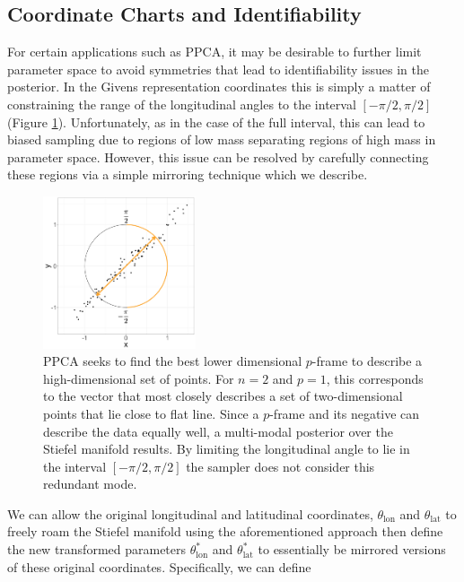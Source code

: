 \documentclass[ba]{imsart}
\numberwithin{equation}{section}
\theoremstyle{plain}
\begin{document}
\subsection{Coordinate Charts and Identifiability}\label{charts_identifiability}
For certain applications such as PPCA, it may be desirable to further limit parameter space to avoid symmetries that lead to identifiability issues in the posterior. In the Givens representation coordinates this is simply a matter of constraining the range of the longitudinal angles to the interval $[-\pi/2,\pi/2]$ (Figure \ref{fig:limiting_pca}). Unfortunately, as in the case of the full interval, this can lead to biased sampling due to regions of low mass separating regions of high mass in parameter space. However, this issue can be resolved by carefully connecting these regions via a simple mirroring technique which we describe.

\begin{figure}[h]
\centering
\vspace{.1in}
\includegraphics[width=0.4\textwidth]{figures/limiting_pca.png}
\vspace{.05in}
\caption{PPCA seeks to find the best lower dimensional $p$-frame to describe a high-dimensional set of points. For $n = 2$ and $p=1$, this corresponds to the vector that most closely describes a set of two-dimensional points that lie close to flat line. Since a $p$-frame and its negative can describe the data equally well, a multi-modal posterior over the Stiefel manifold results. By limiting the longitudinal angle to lie in the interval $[-\pi/2, \pi/2]$ the sampler does not consider this redundant mode.}
\label{fig:limiting_pca}
\end{figure}

\noindent We can allow the original longitudinal and latitudinal coordinates, $\theta_\mathrm{lon}$ and $\theta_\mathrm{lat}$ to freely roam the Stiefel manifold using the aforementioned approach then define the new transformed parameters $\theta_\mathrm{lon}^*$ and $\theta_\mathrm{lat}^*$ to essentially be mirrored versions of these original coordinates. Specifically, we can define
\end{document}
